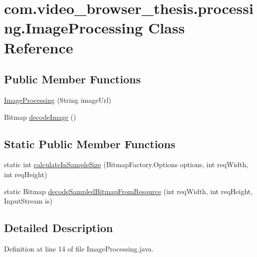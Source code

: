 \hypertarget{classcom_1_1video__browser__thesis_1_1processing_1_1_image_processing}{\section{com.\-video\-\_\-browser\-\_\-thesis.\-processing.\-Image\-Processing Class Reference}
\label{classcom_1_1video__browser__thesis_1_1processing_1_1_image_processing}
}
\subsection*{Public Member Functions}
\begin{DoxyCompactItemize}
\item 
\hyperlink{classcom_1_1video__browser__thesis_1_1processing_1_1_image_processing_a0bdf7979b51e6cf3f33938621ba72f24}{Image\-Processing} (String image\-Url)
\item 
Bitmap \hyperlink{classcom_1_1video__browser__thesis_1_1processing_1_1_image_processing_a68769361c3fd89b73f1b6586e518b90b}{decode\-Image} ()
\end{DoxyCompactItemize}
\subsection*{Static Public Member Functions}
\begin{DoxyCompactItemize}
\item 
static int \hyperlink{classcom_1_1video__browser__thesis_1_1processing_1_1_image_processing_acb25cd46ef7af81fd90399f33149a742}{calculate\-In\-Sample\-Size} (Bitmap\-Factory.\-Options options, int req\-Width, int req\-Height)
\item 
static Bitmap \hyperlink{classcom_1_1video__browser__thesis_1_1processing_1_1_image_processing_a0c573eee1925fe752c3063aaf3377fc4}{decode\-Sampled\-Bitmap\-From\-Resource} (int req\-Width, int req\-Height, Input\-Stream is)
\end{DoxyCompactItemize}


\subsection{Detailed Description}


Definition at line 14 of file Image\-Processing.\-java.



